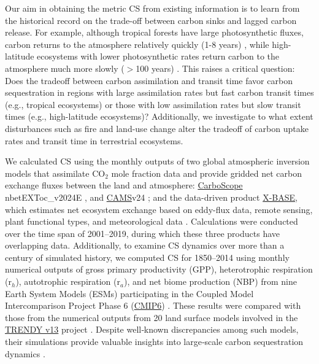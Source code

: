 \documentclass[ProofPDF]{./Styles/Jnls-Template-V3}
\begin{document}
Our aim in obtaining the metric CS from existing information is to learn from the historical record on the trade-off between carbon sinks and lagged carbon release. For example, although tropical forests have large photosynthetic fluxes, carbon returns to the atmosphere relatively quickly (1-8 years) \citep{Sierra2021JE,Chanca2025}, while high-latitude ecosystems with lower photosynthetic rates return carbon to the atmosphere much more slowly ($>$100 years) \citep{Carvalhais2014,Lu2018}. This raises a critical question: Does the tradeoff between carbon assimilation and transit time favor carbon sequestration in regions with large assimilation rates but fast carbon transit times (e.g., tropical ecosystems) or those with low assimilation rates but slow transit times (e.g., high-latitude ecosystems)? Additionally, we investigate to what extent disturbances such as fire and land-use change alter the tradeoff of carbon uptake rates and transit time in terrestrial ecosystems.

We calculated CS using the monthly outputs of two global atmospheric inversion models that assimilate CO$_2$ mole fraction data and provide gridded net carbon exchange fluxes between the land and atmosphere: \hyperlink{https://www.bgc-jena.mpg.de/CarboScope/}{CarboScope} nbetEXToc\_v2024E \citep{Rodenbeck2005}, and \hyperlink{https://ads.atmosphere.copernicus.eu/datasets/cams-global-greenhouse-gas-inversion?tab=overview}{CAMS}v24 \citep{Chevallier2013}; and the data-driven product \hyperlink{https://www.icos-cp.eu/data-products/fluxcom-x-global-fluxes-collection}{X-BASE}, which estimates net ecosystem exchange based on eddy-flux data, remote sensing, plant functional types, and meteorological data \citep{Nelson2024}. Calculations were conducted over the time span of 2001–2019, during which these three products have overlapping data. Additionally, to examine CS dynamics over more than a century of simulated history, we computed CS for 1850–2014 using monthly numerical outputs of gross primary productivity (GPP), heterotrophic respiration (r$_h$), autotrophic respiration (r$_a$), and net biome production (NBP) from nine Earth System Models (ESMs) participating in the Coupled Model Intercomparison Project Phase 6 (\hyperlink{https://pcmdi.llnl.gov/CMIP6/}{CMIP6}) \citep{Eyring2016}. These results were compared with those from the numerical outputs from 20 land surface models involved in the \hyperlink{https://globalcarbonbudgetdata.org/}{TRENDY v13} project \citep{Sitch2024}. Despite well‑known discrepancies among such models, their simulations provide valuable insights into large‑scale carbon sequestration dynamics \citep{Gier2024,Sitch2024}.
  
\end{document}
